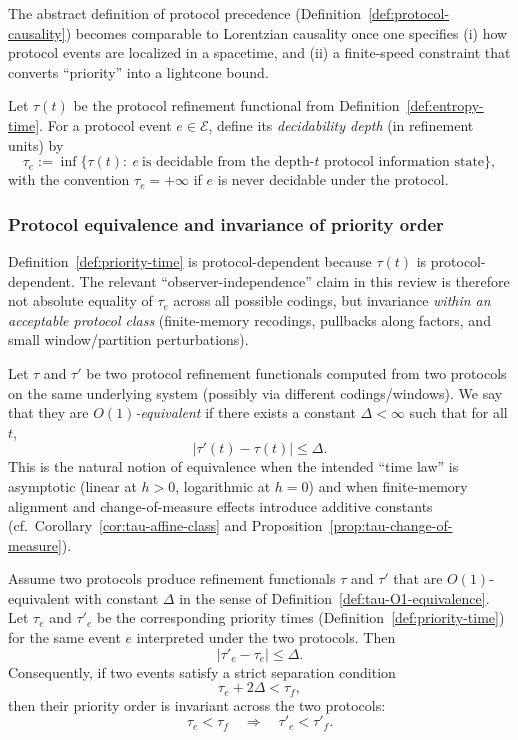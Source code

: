 The abstract definition of protocol precedence (Definition~\ref{def:protocol-causality}) becomes comparable to Lorentzian causality once one specifies (i) how protocol events are localized in a spacetime, and (ii) a finite-speed constraint that converts ``priority'' into a lightcone bound.

\begin{definition}\label{def:priority-time}
Let $\tau(t)$ be the protocol refinement functional from Definition~\ref{def:entropy-time}. For a protocol event $e\in\mathcal{E}$, define its \emph{decidability depth} (in refinement units) by
\[
\tau_e := \inf\{\tau(t):\ e\ \text{is decidable from the depth-$t$ protocol information state}\},
\]
with the convention $\tau_e=+\infty$ if $e$ is never decidable under the protocol.
\end{definition}

\subsubsection{Protocol equivalence and invariance of priority order}\label{sec:causality:priority-invariance}

Definition~\ref{def:priority-time} is protocol-dependent because $\tau(t)$ is protocol-dependent. The relevant ``observer-independence'' claim in this review is therefore not absolute equality of $\tau_e$ across all possible codings, but invariance \emph{within an acceptable protocol class} (finite-memory recodings, pullbacks along factors, and small window/partition perturbations).

\begin{definition}\label{def:tau-O1-equivalence}
Let $\tau$ and $\tau'$ be two protocol refinement functionals computed from two protocols on the same underlying system (possibly via different codings/windows). We say that they are \emph{$O(1)$-equivalent} if there exists a constant $\Delta<\infty$ such that for all $t$,
\[
|\tau'(t)-\tau(t)|\le \Delta.
\]
This is the natural notion of equivalence when the intended ``time law'' is asymptotic (linear at $h>0$, logarithmic at $h=0$) and when finite-memory alignment and change-of-measure effects introduce additive constants (cf.\ Corollary~\ref{cor:tau-affine-class} and Proposition~\ref{prop:tau-change-of-measure}).
\end{definition}

\begin{proposition}\label{prop:priority-O1-stability}
Assume two protocols produce refinement functionals $\tau$ and $\tau'$ that are $O(1)$-equivalent with constant $\Delta$ in the sense of Definition~\ref{def:tau-O1-equivalence}. Let $\tau_e$ and $\tau'_e$ be the corresponding priority times (Definition~\ref{def:priority-time}) for the same event $e$ interpreted under the two protocols. Then
\[
|\tau'_e-\tau_e|\le \Delta.
\]
Consequently, if two events satisfy a strict separation condition
\[
\tau_e + 2\Delta < \tau_f,
\]
then their priority order is invariant across the two protocols:
\[
\tau_e<\tau_f\quad \Longrightarrow\quad \tau'_e<\tau'_f.
\]
\end{proposition}

